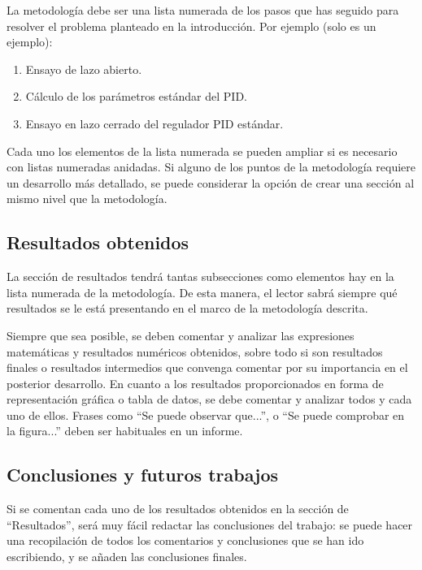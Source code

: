 \documentclass[11pt]{article}
\begin{document}
La metodología debe ser una lista numerada de los pasos que has seguido para resolver el problema planteado en la introducción. Por ejemplo (solo es un ejemplo):

\begin{enumerate}
    \item Ensayo de lazo abierto.
    \item Cálculo de los parámetros estándar del PID.
    \item Ensayo en lazo cerrado del regulador PID estándar.
\end{enumerate}

Cada uno los elementos de la lista numerada se pueden ampliar si es necesario con listas numeradas anidadas. Si alguno de los puntos de la metodología requiere un desarrollo más detallado, se puede considerar la opción de crear una sección al mismo nivel que la metodología.

\subsection{Resultados obtenidos}

La sección de resultados tendrá tantas subsecciones como elementos hay en la lista numerada de la metodología. De esta manera, el lector sabrá siempre qué resultados se le está presentando en el marco de la metodología descrita.

Siempre que sea posible, se deben comentar y analizar las expresiones matemáticas y resultados numéricos obtenidos, sobre todo si son resultados finales o resultados intermedios que convenga comentar por su importancia en el posterior desarrollo. En cuanto a los resultados proporcionados en forma de representación gráfica o tabla de datos, se debe comentar y analizar todos y cada uno de ellos. Frases como ``Se puede observar que...'', o ``Se puede comprobar en la figura...'' deben ser habituales en un informe.

\subsection{Conclusiones y futuros trabajos}

Si se comentan cada uno de los resultados obtenidos en la sección de ``Resultados'', será muy fácil redactar las conclusiones del trabajo: se puede hacer una recopilación de todos los comentarios y conclusiones que se han ido escribiendo, y se añaden las conclusiones finales.
\end{document}
